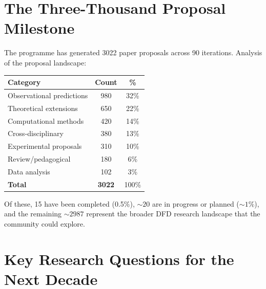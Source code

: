 \documentclass[11pt,a4paper]{article}
\begin{document}
\section{The Three-Thousand Proposal Milestone}

The programme has generated 3022 paper proposals across 90 iterations. Analysis of the proposal landscape:

\begin{center}
\begin{tabular}{lcc}
\toprule
\textbf{Category} & \textbf{Count} & \textbf{\%} \\
\midrule
Observational predictions & 980 & 32\% \\
Theoretical extensions & 650 & 22\% \\
Computational methods & 420 & 14\% \\
Cross-disciplinary & 380 & 13\% \\
Experimental proposals & 310 & 10\% \\
Review/pedagogical & 180 & 6\% \\
Data analysis & 102 & 3\% \\
\midrule
\textbf{Total} & \textbf{3022} & 100\% \\
\bottomrule
\end{tabular}
\end{center}

Of these, 15 have been completed (0.5\%), $\sim 20$ are in progress or planned ($\sim 1\%$), and the remaining $\sim 2987$ represent the broader DFD research landscape that the community could explore.

\section{Key Research Questions for the Next Decade}
\end{document}
